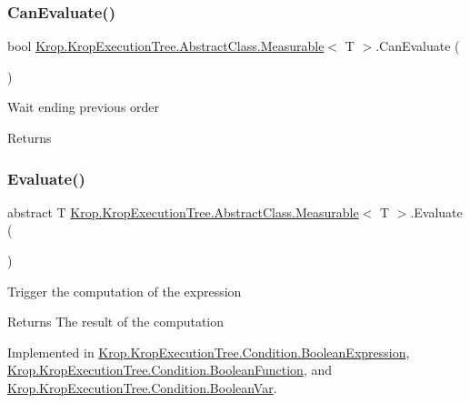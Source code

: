\subsubsection{\texorpdfstring{Can\+Evaluate()}{CanEvaluate()}}
{\footnotesize\ttfamily bool \mbox{\hyperlink{class_krop_1_1_krop_execution_tree_1_1_abstract_class_1_1_measurable}{Krop.\+Krop\+Execution\+Tree.\+Abstract\+Class.\+Measurable}}$<$ T $>$.Can\+Evaluate (\begin{DoxyParamCaption}{ }\end{DoxyParamCaption})}



Wait ending previous order 

\begin{DoxyReturn}{Returns}

\end{DoxyReturn}
\mbox{\label{class_krop_1_1_krop_execution_tree_1_1_abstract_class_1_1_measurable_afe91c739e2db11c8f316b07e8f55f7bb}} 
\subsubsection{\texorpdfstring{Evaluate()}{Evaluate()}}
{\footnotesize\ttfamily abstract T \mbox{\hyperlink{class_krop_1_1_krop_execution_tree_1_1_abstract_class_1_1_measurable}{Krop.\+Krop\+Execution\+Tree.\+Abstract\+Class.\+Measurable}}$<$ T $>$.Evaluate (\begin{DoxyParamCaption}{ }\end{DoxyParamCaption})\hspace{0.3cm}{\ttfamily [pure virtual]}}



Trigger the computation of the expression 

\begin{DoxyReturn}{Returns}
The result of the computation 
\end{DoxyReturn}


Implemented in \mbox{\hyperlink{class_krop_1_1_krop_execution_tree_1_1_condition_1_1_boolean_expression_a0d5dccaa10e9fa7933cf96edd1e670dd}{Krop.\+Krop\+Execution\+Tree.\+Condition.\+Boolean\+Expression}}, \mbox{\hyperlink{class_krop_1_1_krop_execution_tree_1_1_condition_1_1_boolean_function_a1e274ef1079b4ab8136c45b5f48c747e}{Krop.\+Krop\+Execution\+Tree.\+Condition.\+Boolean\+Function}}, and \mbox{\hyperlink{class_krop_1_1_krop_execution_tree_1_1_condition_1_1_boolean_var_a293790e0485139dcf84fe9c35a5bac4a}{Krop.\+Krop\+Execution\+Tree.\+Condition.\+Boolean\+Var}}.



